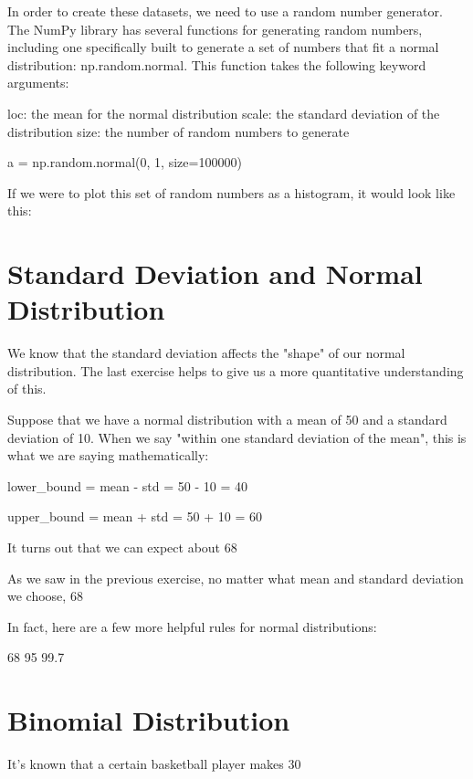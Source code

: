 \documentclass{journal}
\begin{document}
In order to create these datasets, we need to use a random number generator. The NumPy library has several functions for generating random numbers, including one specifically built to generate a set of numbers that fit a normal distribution: np.random.normal. This function takes the following keyword arguments:

    loc: the mean for the normal distribution
    scale: the standard deviation of the distribution
    size: the number of random numbers to generate

a = np.random.normal(0, 1, size=100000)

If we were to plot this set of random numbers as a histogram, it would look like this: 

\section{Standard Deviation and Normal Distribution}
We know that the standard deviation affects the "shape" of our normal distribution. The last exercise helps to give us a more quantitative understanding of this.

Suppose that we have a normal distribution with a mean of 50 and a standard deviation of 10. When we say "within one standard deviation of the mean", this is what we are saying mathematically:

lower_bound = mean - std
            = 50 - 10
            = 40

upper_bound = mean + std
            = 50 + 10
            = 60

It turns out that we can expect about 68%

As we saw in the previous exercise, no matter what mean and standard deviation we choose, 68%

In fact, here are a few more helpful rules for normal distributions:

    68%
    95%
    99.7%

\section{Binomial Distribution}

It's known that a certain basketball player makes 30%
\end{document}
